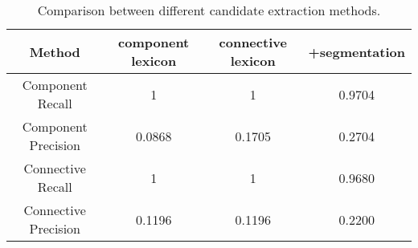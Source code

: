 \begin{table}[ht]
\centering
\begin{tabular}{|c|c|c|c|}
\hline
Method                  & component lexicon & connective lexicon & +segmentation \\ \hline

Component Recall        & 1                 & 1                  & 0.9704        \\ \hline
Component Precision     & 0.0868            & 0.1705             & 0.2704        \\

\hhline{|=|=|=|=|}

Connective Recall       & 1                 & 1                  & 0.9680        \\ \hline
Connective Precision    & 0.1196            & 0.1196             & 0.2200        \\ \hline

\end{tabular}
\caption{\label{t:cand-extract} Comparison between different candidate extraction methods.}
\end{table}
